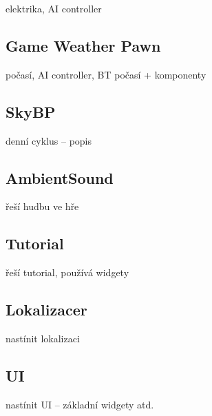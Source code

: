 elektrika, AI controller

\subsection{Game Weather Pawn}

počasí, AI controller, BT počasí + komponenty

\subsection{SkyBP}

denní cyklus -- popis

\subsection{AmbientSound}

řeší hudbu ve hře

\subsection{Tutorial}

řeší tutorial, používá widgety


\subsection{Lokalizacer}

nastínit lokalizaci



\subsection{UI}
nastínit UI -- základní widgety atd.



